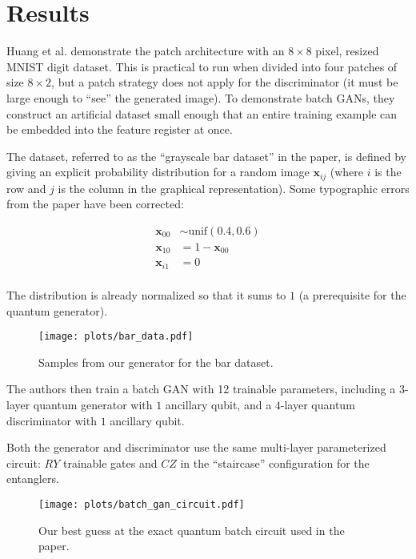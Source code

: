 \section{Results}
Huang et al. demonstrate the patch architecture with an $8\times 8$ pixel, resized
MNIST digit dataset.  This is practical to run when divided into four patches of
size $8\times 2$, but a patch strategy does not apply for the discriminator (it must
be large enough to ``see'' the generated image).  To demonstrate batch GANs,
they construct an artificial dataset small enough that an entire training
example can be embedded into the feature register at once.

The dataset, referred to as the ``grayscale bar dataset'' in the paper, is
defined by giving an explicit probability distribution for a random image
$\bm{x}_{ij}$ (where $i$ is the row and $j$ is the column in the graphical
representation).  Some typographic errors from the paper have been corrected:

\begin{align*}
  \bm{x}_{00} &\sim \text{unif}(0.4, 0.6) \\
  \bm{x}_{10} &= 1 - \bm{x}_{00} \\
  \bm{x}_{i1} &= 0 \\
\end{align*}

The distribution is already normalized so that it sums to $1$ (a prerequisite
for the quantum generator).

\begin{figure}[H]
    \centering
    \texttt{[image: plots/bar\_data.pdf]}
    \caption{Samples from our generator for the bar dataset.}
    \label{fig:bar_data}
\end{figure}

The authors then train a batch GAN with 12 trainable parameters,
including a $3$-layer quantum generator with $1$ ancillary qubit, and
a $4$-layer quantum discriminator with $1$ ancillary qubit.

Both the generator and discriminator use the same multi-layer parameterized circuit: 
$RY$ trainable gates and $CZ$ in the ``staircase'' configuration for the entanglers.

\begin{figure}[H]
    \centering
    \texttt{[image: plots/batch\_gan\_circuit.pdf]}
    \caption{Our best guess at the exact quantum batch circuit used in the paper.}
    \label{fig:batch_gan_circuit}
\end{figure}

